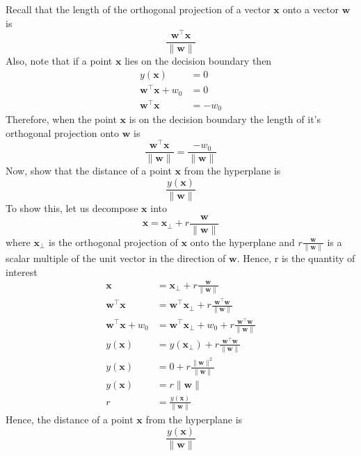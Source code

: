 \documentclass[12pt]{article}
\newcommand{\x}{\mathbf{x}}
\newcommand{\w}{\mathbf{w}}
\newcommand{\yOfX}{y\left(\x\right)}
\newcommand{\yOfXBot}{y\left(\x_\bot\right)}
\begin{document}
Recall that the length of the orthogonal projection of a vector $\x$ onto a
vector $\w$ is
%
\begin{equation*}
  \frac{\w^\top\x}{\|\w\|}
\end{equation*}
%
Also, note that if a point $\x$ lies on the decision boundary then
%
\begin{align*}
  \yOfX &= 0 \\
  \w^\top\x + w_0 &= 0 \\
  \w^\top\x &= -w_0
\end{align*}
%
Therefore, when the point $\x$ is on the decision boundary the length of it's
orthogonal projection onto $\w$ is
%
\begin{equation*}
  \frac{\w^\top\x}{\|\w\|} = \frac{-w_0}{\|\w\|}  
\end{equation*}
%
Now, show that the distance of a point $\x$ from the hyperplane is
%
\begin{equation*}
  \frac{\yOfX}{\|\w\|}
\end{equation*}
%
To show this, let us decompose $\x$ into
%
\begin{equation*}
  \x = \x_\bot + r\frac{\w}{\|\w\|}
\end{equation*}
%
where $\x_\bot$ is the orthogonal projection of $\x$ onto the hyperplane and
$r\frac{\w}{\|\w\|}$ is a scalar multiple of the unit vector in the direction of
$\w$. Hence, r is the quantity of interest
%
\begin{align*}
  \x &= \x_\bot + r\frac{\w}{\|\w\|} \\
  \w^\top\x &= \w^\top\x_\bot + r\frac{\w^\top\w}{\|\w\|} \\
  \w^\top\x + w_0 &= \w^\top\x_\bot + w_0 + r\frac{\w^\top\w}{\|\w\|} \\
  \yOfX &= \yOfXBot + r\frac{\w^\top\w}{\|\w\|} \\
  \yOfX &= 0 + r\frac{\|\w\|^2}{\|\w\|} \\
  \yOfX &= r\|\w\| \\
  r &= \frac{\yOfX}{\|\w\|}
\end{align*}
%
Hence, the distance of a point $\x$ from the hyperplane is
%
\begin{equation*}
  \frac{\yOfX}{\|\w\|}
\end{equation*}
\end{document}
